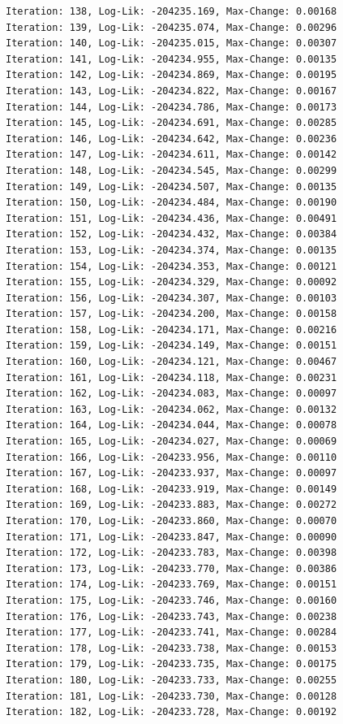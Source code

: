 \documentclass[
  letterpaper,
  DIV=11,
  numbers=noendperiod]{scrreport}
\begin{document}
\begin{verbatim}
Iteration: 138, Log-Lik: -204235.169, Max-Change: 0.00168
Iteration: 139, Log-Lik: -204235.074, Max-Change: 0.00296
Iteration: 140, Log-Lik: -204235.015, Max-Change: 0.00307
Iteration: 141, Log-Lik: -204234.955, Max-Change: 0.00135
Iteration: 142, Log-Lik: -204234.869, Max-Change: 0.00195
Iteration: 143, Log-Lik: -204234.822, Max-Change: 0.00167
Iteration: 144, Log-Lik: -204234.786, Max-Change: 0.00173
Iteration: 145, Log-Lik: -204234.691, Max-Change: 0.00285
Iteration: 146, Log-Lik: -204234.642, Max-Change: 0.00236
Iteration: 147, Log-Lik: -204234.611, Max-Change: 0.00142
Iteration: 148, Log-Lik: -204234.545, Max-Change: 0.00299
Iteration: 149, Log-Lik: -204234.507, Max-Change: 0.00135
Iteration: 150, Log-Lik: -204234.484, Max-Change: 0.00190
Iteration: 151, Log-Lik: -204234.436, Max-Change: 0.00491
Iteration: 152, Log-Lik: -204234.432, Max-Change: 0.00384
Iteration: 153, Log-Lik: -204234.374, Max-Change: 0.00135
Iteration: 154, Log-Lik: -204234.353, Max-Change: 0.00121
Iteration: 155, Log-Lik: -204234.329, Max-Change: 0.00092
Iteration: 156, Log-Lik: -204234.307, Max-Change: 0.00103
Iteration: 157, Log-Lik: -204234.200, Max-Change: 0.00158
Iteration: 158, Log-Lik: -204234.171, Max-Change: 0.00216
Iteration: 159, Log-Lik: -204234.149, Max-Change: 0.00151
Iteration: 160, Log-Lik: -204234.121, Max-Change: 0.00467
Iteration: 161, Log-Lik: -204234.118, Max-Change: 0.00231
Iteration: 162, Log-Lik: -204234.083, Max-Change: 0.00097
Iteration: 163, Log-Lik: -204234.062, Max-Change: 0.00132
Iteration: 164, Log-Lik: -204234.044, Max-Change: 0.00078
Iteration: 165, Log-Lik: -204234.027, Max-Change: 0.00069
Iteration: 166, Log-Lik: -204233.956, Max-Change: 0.00110
Iteration: 167, Log-Lik: -204233.937, Max-Change: 0.00097
Iteration: 168, Log-Lik: -204233.919, Max-Change: 0.00149
Iteration: 169, Log-Lik: -204233.883, Max-Change: 0.00272
Iteration: 170, Log-Lik: -204233.860, Max-Change: 0.00070
Iteration: 171, Log-Lik: -204233.847, Max-Change: 0.00090
Iteration: 172, Log-Lik: -204233.783, Max-Change: 0.00398
Iteration: 173, Log-Lik: -204233.770, Max-Change: 0.00386
Iteration: 174, Log-Lik: -204233.769, Max-Change: 0.00151
Iteration: 175, Log-Lik: -204233.746, Max-Change: 0.00160
Iteration: 176, Log-Lik: -204233.743, Max-Change: 0.00238
Iteration: 177, Log-Lik: -204233.741, Max-Change: 0.00284
Iteration: 178, Log-Lik: -204233.738, Max-Change: 0.00153
Iteration: 179, Log-Lik: -204233.735, Max-Change: 0.00175
Iteration: 180, Log-Lik: -204233.733, Max-Change: 0.00255
Iteration: 181, Log-Lik: -204233.730, Max-Change: 0.00128
Iteration: 182, Log-Lik: -204233.728, Max-Change: 0.00192

\end{verbatim}
\end{document}
